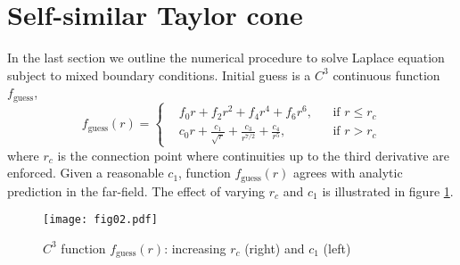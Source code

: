 \documentclass{jfm}
\begin{document}
\section{Self-similar Taylor cone}
In the last section we outline the numerical procedure to solve Laplace equation subject to mixed boundary conditions.
Initial guess is a $C^3$ continuous function $f_\mathrm{guess}$,
\begin{equation}
f_\mathrm{guess}(r)=\left\{\begin{aligned}
&f_0r+f_2r^2+f_4r^4+f_6r^6,&&\textrm{if }r\le r_c\\
&c_0 r + \frac{c_1}{\sqrt{r}} +\frac{c_3}{r^{7/2}}+\frac{c_4}{r^{5}},&&\textrm{if }r>r_c
\end{aligned}\right.
\end{equation}
where $r_c$ is the connection point where continuities up to the third derivative are enforced.
Given a reasonable $c_1$, function $f_\mathrm{guess}(r)$ agrees with analytic prediction in the far-field.
The effect of varying $r_c$ and $c_1$ is illustrated in figure \ref{fig:initialGuess}.
\begin{figure}
  \centering
  \texttt{[image: fig02.pdf]}%
  \caption{$C^3$ function $f_\mathrm{guess}(r)$: increasing $r_c$ (right) and $c_1$ (left)  }
\label{fig:initialGuess}
\end{figure}






























\end{document}
